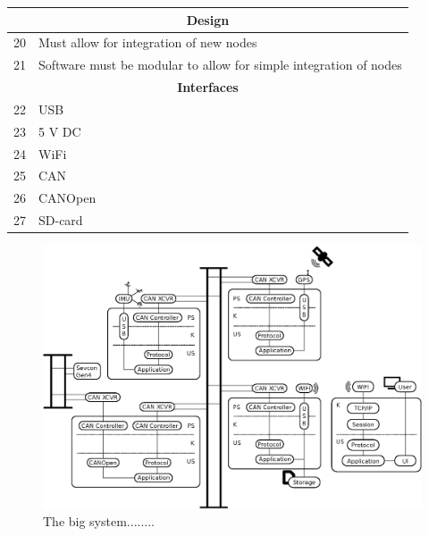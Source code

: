 \begin{table}[H]
\begin{tabular}{ |p{0.3cm}|p{10.5cm}| }
\hline
\multicolumn{2}{|c|}{\textbf{Design}}\\
\hline	
20 & Must allow for integration of new nodes		 					 \\
21 & Software must be modular to allow for simple integration of nodes	 \\

\hline
\multicolumn{2}{|c|}{\textbf{Interfaces}}\\
\hline	
22 & USB 		 						\\
23 & 5 V DC		 						\\
24 & WiFi	 							\\
25 & CAN 		 						\\
26 & CANOpen 		 					\\
27 & SD-card 		 					\\
\hline
\end{tabular}
\end{table}

\newpage
\begin{figure}[!h]
	\centering
	\includegraphics[angle=90,width=\textwidth]{graphics/analysis_complex.eps}
	\caption{The big system........}
	\label{fig:complete_system}
\end{figure}



